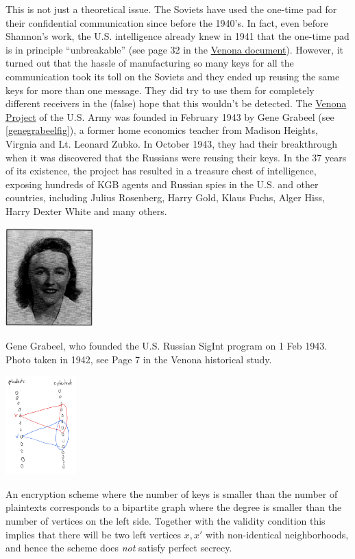 This is not just a theoretical issue. The Soviets have used the one-time
pad for their confidential communication since before the 1940's. In
fact, even before Shannon's work, the U.S. intelligence already knew in
1941 that the one-time pad is in principle ``unbreakable'' (see page 32
in the \href{http://nsarchive.gwu.edu/NSAEBB/NSAEBB278/01.PDF}{Venona
document}). However, it turned out that the hassle of manufacturing so
many keys for all the communication took its toll on the Soviets and
they ended up reusing the same keys for more than one message. They did
try to use them for completely different receivers in the (false) hope
that this wouldn't be detected. The
\href{https://en.wikipedia.org/wiki/Venona_project}{Venona Project} of
the U.S. Army was founded in February 1943 by Gene Grabeel (see
\cref{genegrabeelfig}), a former home economics teacher from Madison
Heights, Virgnia and Lt. Leonard Zubko. In October 1943, they had their
breakthrough when it was discovered that the Russians were reusing their
keys. In the 37 years of its existence, the project has resulted in a
treasure chest of intelligence, exposing hundreds of KGB agents and
Russian spies in the U.S. and other countries, including Julius
Rosenberg, Harry Gold, Klaus Fuchs, Alger Hiss, Harry Dexter White and
many others.

\begin{marginfigure}
\centering
\includegraphics[width=\linewidth, height=1.5in, keepaspectratio]{../figure/genevenona.png}
\caption{Gene Grabeel, who founded the U.S. Russian SigInt program on 1
Feb 1943. Photo taken in 1942, see Page 7 in the Venona historical
study.}
\label{genegrabeelfig}
\end{marginfigure}

\begin{marginfigure}
\centering
\includegraphics[width=\linewidth, height=1.5in, keepaspectratio]{../figure/longkeygraph.png}
\caption{An encryption scheme where the number of keys is smaller than
the number of plaintexts corresponds to a bipartite graph where the
degree is smaller than the number of vertices on the left side. Together
with the validity condition this implies that there will be two left
vertices \(x,x'\) with non-identical neighborhoods, and hence the scheme
does \emph{not} satisfy perfect secrecy.}
\label{longkeygraphfig}
\end{marginfigure}


